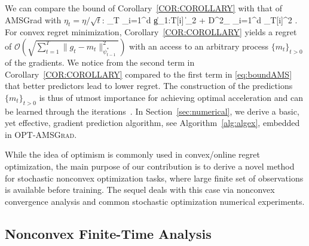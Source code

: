 \documentclass[wcp]{jmlr}
\begin{document}
We can compare the bound of Corollary~\ref{COR:COROLLARY} with that of AMSGrad \citep{RKK18} with $\eta_t = \eta/\sqrt{t}$:
\beq\label{eq:boundAMS}
_T \leq {} \sum_{i=1}^d \| g_{1:T}[i]  \|_2 + D^2_{\infty} \sum_{i=1}^d _T[i]^2 \eqsp.
\eeq
For convex regret minimization, Corollary~\ref{COR:COROLLARY} yields a regret of $\mathcal{O}(\sqrt{\sum_{t=1}^T \| g_t - m_t  \|^2_{\psi^*_{t-1}}})$ with an access to an arbitrary process $\{m_t\}_{t>0}$ of the gradients.
We notice from the second term in Corollary~\ref{COR:COROLLARY} compared to the first term in \eqref{eq:boundAMS} that better predictors lead to lower regret.
The construction of the predictions $\{m_t\}_{t>0}$ is thus of utmost importance for achieving optimal acceleration and can be learned through the iterations~\citep{RS13b}.
In Section~\ref{sec:numerical}, we derive a basic, yet effective, gradient prediction algorithm, see Algorithm~\ref{alg:algex}, embedded in \textsc{OPT-AMSGrad}.

While the idea of optimism is commonly used in convex/online regret optimization, the main purpose of our contribution is to derive a novel method for stochastic nonconvex optimization tasks, where large finite set of observations is available before training. The sequel deals with this case via nonconvex convergence analysis and common stochastic optimization numerical experiments.

\vspace{-0.05in}
\subsection{Nonconvex Finite-Time Analysis}
\vspace{-0.05in}
\end{document}
